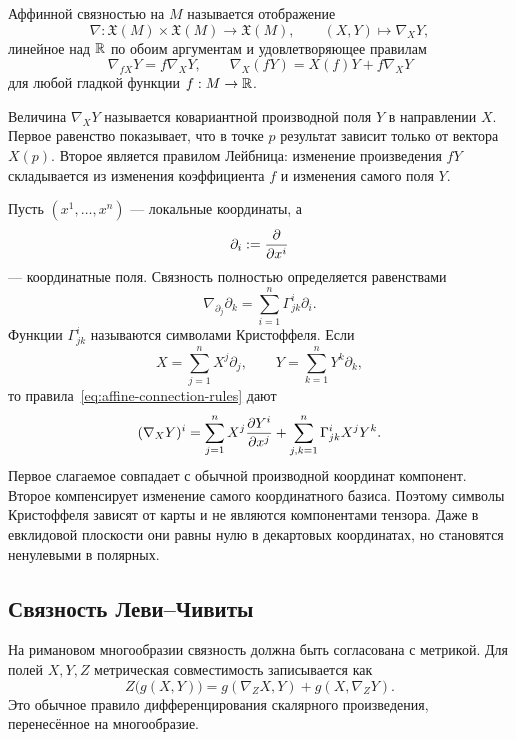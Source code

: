 \begin{definition}
Аффинной связностью на $M$ называется отображение
\[
\nabla:\mathfrak X(M)\times\mathfrak X(M)\to\mathfrak X(M),
\qquad
(X,Y)\mapsto\nabla_XY,
\]
линейное над $\mathbb{R}$ по обоим аргументам и удовлетворяющее правилам
\begin{equation}
\label{eq:affine-connection-rules}
\nabla_{fX}Y=f\nabla_XY,
\qquad
\nabla_X(fY)=X(f)Y+f\nabla_XY
\end{equation}
для любой гладкой функции $f:M\to\mathbb{R}$.
\end{definition}

Величина $\nabla_XY$ называется ковариантной производной поля $Y$ в направлении $X$. Первое равенство показывает, что в точке $p$ результат зависит только от вектора $X(p)$. Второе является правилом Лейбница: изменение произведения $fY$ складывается из изменения коэффициента $f$ и изменения самого поля $Y$.

Пусть $(x^1,\ldots,x^n)$ --- локальные координаты, а
\[
\partial_i:=\frac{\partial }{\partial x^i}
\]
--- координатные поля. Связность полностью определяется равенствами
\begin{equation}
\label{eq:christoffel-definition}
\nabla_{\partial_j}\partial_k
=
\sum_{i=1}^n\Gamma^i_{jk}\partial_i.
\end{equation}
Функции $\Gamma^i_{jk}$ называются символами Кристоффеля. Если
\[
X=\sum_{j=1}^nX^j\partial_j,
\qquad
Y=\sum_{k=1}^nY^k\partial_k,
\]
то правила~\eqref{eq:affine-connection-rules} дают
\begin{equation}
\label{eq:covariant-derivative-coordinates}
(\nabla_XY)^i
=
\sum_{j=1}^nX^j\frac{\partial Y^i}{\partial x^j}
+
\sum_{j,k=1}^n\Gamma^i_{jk}X^jY^k.
\end{equation}
Первое слагаемое совпадает с обычной производной координат компонент. Второе компенсирует изменение самого координатного базиса. Поэтому символы Кристоффеля зависят от карты и не являются компонентами тензора. Даже в евклидовой плоскости они равны нулю в декартовых координатах, но становятся ненулевыми в полярных.

\subsection{Связность Леви--Чивиты}

На римановом многообразии связность должна быть согласована с метрикой. Для полей $X,Y,Z$ метрическая совместимость записывается как
\begin{equation}
\label{eq:metric-compatibility}
Z\bigl(g(X,Y)\bigr)
=
g(\nabla_ZX,Y)+g(X,\nabla_ZY).
\end{equation}
Это обычное правило дифференцирования скалярного произведения, перенесённое на многообразие.

